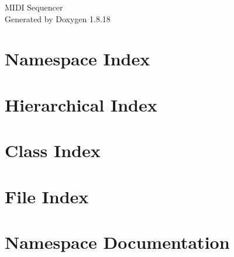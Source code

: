 \let\mypdfximage\pdfximage\def\pdfximage{\immediate\mypdfximage}\documentclass[twoside]{book}
\newcommand{\+}{\discretionary{\mbox{\scriptsize$\hookleftarrow$}}{}{}}
\newcommand{\clearemptydoublepage}{%
  \newpage{\pagestyle{empty}\cleardoublepage}%
}
\begin{document}
\hypersetup{pageanchor=false,
             bookmarksnumbered=true,
             pdfencoding=unicode
            }
\begin{titlepage}
\vspace*{7cm}
\begin{center}%
{\Large M\+I\+DI Sequencer }\\
\vspace*{1cm}
{\large Generated by Doxygen 1.8.18}\\
\end{center}
\end{titlepage}
\clearemptydoublepage
{}
\tableofcontents
\clearemptydoublepage
{}
\hypersetup{pageanchor=true}

\chapter{Namespace Index}

\chapter{Hierarchical Index}

\chapter{Class Index}

\chapter{File Index}

\chapter{Namespace Documentation}

\end{document}
